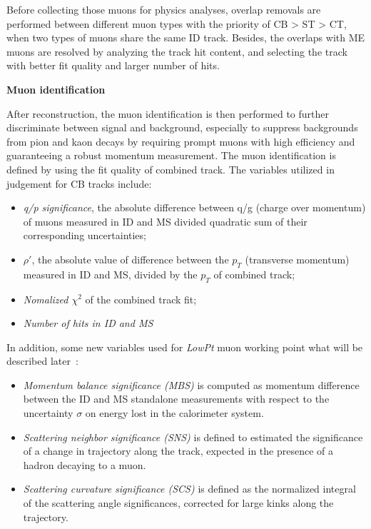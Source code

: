Before collecting those muons for physics analyses, overlap removals are performed between different muon types with the priority of CB > ST > CT, when two types of muons share the same ID track.
Besides, the overlaps with ME muons are resolved by analyzing the track hit content, and selecting the track with better fit quality and larger number of hits.

\textbf{Muon identification}

After reconstruction, the muon identification is then performed to further discriminate between signal and background, especially to suppress backgrounds from pion and kaon decays by requiring prompt muons with high efficiency and guaranteeing a robust momentum measurement.
The muon identification is defined by using the fit quality of combined track. 
The variables utilized in judgement for CB tracks include:
\begin{itemize}
	\item \textit{q/p significance}, the absolute difference between q/g (charge over momentum) of muons measured in ID and MS divided quadratic sum of their corresponding uncertainties;
	\item \textit{$\rho'$}, the absolute value of difference between the $p_{T}$ (transverse momentum) measured in ID and MS, divided by the $p_{T}$ of combined track;
	\item \textit{Nomalized $\chi^{2}$} of the combined track fit;
	\item \textit{Number of hits in ID and MS}
\end{itemize}
In addition, some new variables used for \textit{LowPt} muon working point what will be described later~\cite{Zheng:2649299}:
\begin{itemize}
	\item \textit{Momentum balance significance (MBS) } is computed as momentum difference between the ID and MS standalone measurements with respect to the uncertainty $\sigma$ on energy lost in the calorimeter system.
	\item \textit{Scattering neighbor significance (SNS)} is defined to estimated the significance of a change in trajectory along the track, expected in the presence of a hadron decaying to a muon.
	\item \textit{Scattering curvature significance (SCS)} is defined as the normalized integral of the scattering angle significances, corrected for large kinks along the trajectory.
\end{itemize}

